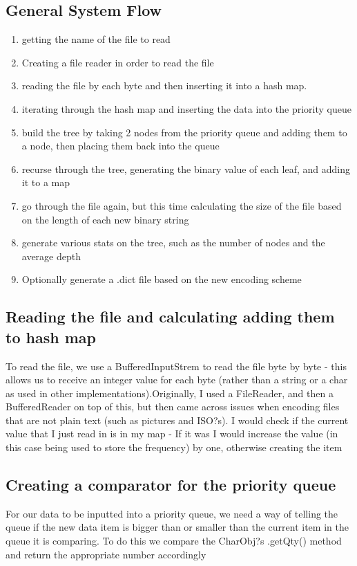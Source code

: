 \documentclass[11pt, oneside]{amsart}
\begin{document}
\subsection{General System Flow}
\begin{enumerate}
	\item getting the name of the file to read
	\item Creating a file reader in order to read the file
	\item reading the file by each byte and then inserting it into a hash map.
	\item iterating through the hash map and inserting the data into the priority queue
	\item build the tree by taking 2 nodes from the priority queue and adding them to a node, then placing them back into the queue
	\item recurse through the tree, generating the binary value of each leaf, and adding it to a map
	\item go through the file again, but this time calculating the size of the file based on the length of each new binary string
	\item generate various stats on the tree, such as the number of nodes and the
average depth
	\item Optionally generate a .dict file based on the new encoding scheme
\end{enumerate}
\subsection{Reading the file and calculating adding them to hash map}
To read the file, we use a BufferedInputStrem to read the file byte by byte - this allows us to receive an integer value for each byte (rather than a string or a char as used in other implementations).Originally, I used a FileReader, and then a BufferedReader on top of this, but then came across issues when encoding files that are not plain text (such as pictures and ISO?s). I would check if the current value that I just read in is in my map - If it was I would increase the value (in this case being used to store the frequency) by one, otherwise creating the item
\subsection{Creating a comparator for the priority queue}
For our data to be inputted into a priority queue, we need a way of telling the queue if the new data item is bigger than or smaller than the current item in the queue it is comparing. To do this we compare the CharObj?s .getQty() method and return the appropriate number accordingly
\end{document}
